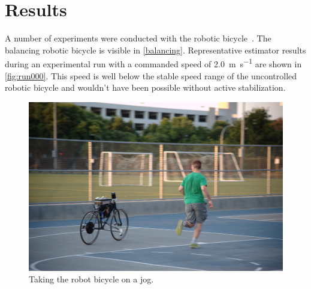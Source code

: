 \documentclass[letterpaper,11pt]{article}
\begin{document}
\section{Results} \label{sec:results}
A number of experiments were conducted with the robotic
bicycle~\cite{Peterson2013}. The balancing robotic bicycle is visible in
\autoref{balancing}. Representative estimator results during an experimental
run with a commanded speed of \SI{2.0}{\m\per\s} are shown in
\autoref{fig:run000}. This speed is well below the stable speed range of the
uncontrolled robotic bicycle and wouldn't have been possible without active
stabilization.
\begin{figure}[htbp]
  \centering
  \includegraphics[width=\textwidth]{images/balancing.jpg}
  \caption{Taking the robot bicycle on a jog.}
  \label{balancing}
\end{figure}
\end{document}
